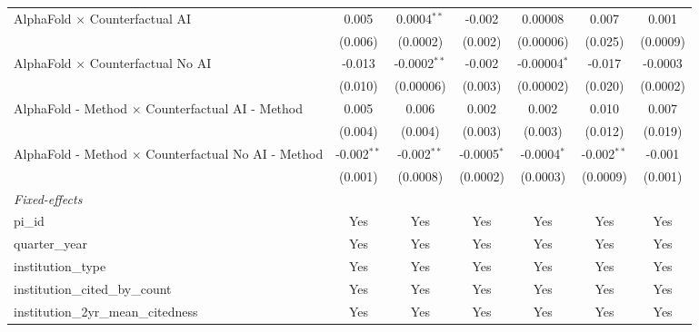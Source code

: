 \begin{tabular}{lcccccc}
   AlphaFold $\times$ Counterfactual AI                        & 0.005         & 0.0004$^{**}$  & -0.002        & 0.00008        & 0.007         & 0.001\\   
                                                               & (0.006)       & (0.0002)       & (0.002)       & (0.00006)      & (0.025)       & (0.0009)\\   
   AlphaFold $\times$ Counterfactual No AI                     & -0.013        & -0.0002$^{**}$ & -0.002        & -0.00004$^{*}$ & -0.017        & -0.0003\\   
                                                               & (0.010)       & (0.00006)      & (0.003)       & (0.00002)      & (0.020)       & (0.0002)\\   
   AlphaFold - Method $\times$ Counterfactual AI - Method      & 0.005         & 0.006          & 0.002         & 0.002          & 0.010         & 0.007\\   
                                                               & (0.004)       & (0.004)        & (0.003)       & (0.003)        & (0.012)       & (0.019)\\   
   AlphaFold - Method $\times$ Counterfactual No AI - Method   & -0.002$^{**}$ & -0.002$^{**}$  & -0.0005$^{*}$ & -0.0004$^{*}$  & -0.002$^{**}$ & -0.001\\   
                                                               & (0.001)       & (0.0008)       & (0.0002)      & (0.0003)       & (0.0009)      & (0.001)\\   
   \midrule
   \emph{Fixed-effects}\\
   pi\_id                                                      & Yes           & Yes            & Yes           & Yes            & Yes           & Yes\\  
   quarter\_year                                               & Yes           & Yes            & Yes           & Yes            & Yes           & Yes\\  
   institution\_type                                           & Yes           & Yes            & Yes           & Yes            & Yes           & Yes\\  
   institution\_cited\_by\_count                               & Yes           & Yes            & Yes           & Yes            & Yes           & Yes\\  
   institution\_2yr\_mean\_citedness                           & Yes           & Yes            & Yes           & Yes            & Yes           & Yes\\  

\end{tabular}

